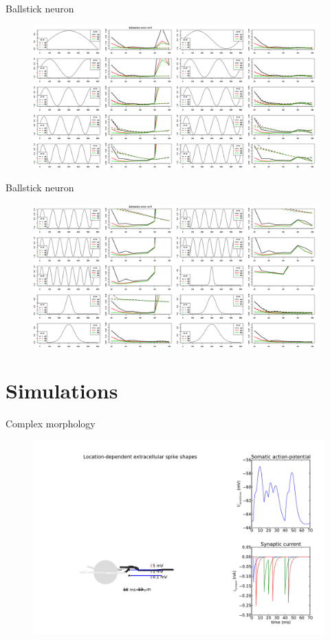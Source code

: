 \documentclass[11pt,a4paper,titlepage]{beamer}
\begin{document}
\begin{frame}{Ballstick neuron}

\begin{figure}
\includegraphics[height=5.5cm]{plots/error_Rtest_cos_patt3_12_el_both.png}
\end{figure}
\end{frame}

\begin{frame}{Ballstick neuron}

\begin{figure}
\includegraphics[height=5.5cm]{plots/error_Rtest_cos_patt13_22_el_both.png}
\end{figure}
\end{frame}
\section{Simulations}
\begin{frame}{Complex morphology}
\begin{figure}
\includegraphics[height=6.8 cm]{plots/lfpy_setup.pdf}
\end{figure}

\end{frame}
\end{document}
